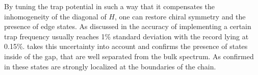 By tuning the trap potential in such a way that it compensates the inhomogeneity of the diagonal of $H$, one can restore chiral symmetry and the presence of edge states. As discussed in  the accuracy of implementing a certain trap frequency usually reaches 1\% standard deviation with the record lying at 0.15\%.  takes this uncertainty into account and confirms the presence of states inside of the gap, that are well separated from the bulk spectrum. As confirmed in  these states are strongly localized at the boundaries of the chain.%

